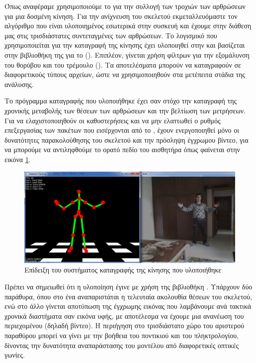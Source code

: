 Όπως αναφέραμε χρησιμοποιούμε το  για την συλλογή των τροχιών των αρθρώσεων για μια δοσμένη κίνηση. Για την ανίχνευση του σκελετού εκμεταλλευόμαστε τον αλγόριθμο που είναι υλοποιημένος εσωτερικά στην συσκευή και έχουμε στην διάθεση μας στις τρισδιάστατες συντεταγμένες των αρθρώσεων. Το λογισμικό που χρησιμοποιείται για την καταγραφή της κίνησης έχει υλοποιηθεί στην  και βασίζεται στην βιβλιοθήκη της  για το  (). Επιπλέον, γίνεται χρήση φίλτρων για την εξομάλυνση του θορύβου και του τρέμουλο (). Τα αποτελέσματα μπορούν να καταγραφούν σε διαφορετικούς τύπους αρχείων, ώστε να χρησιμοποιηθούν στα μετέπειτα στάδια της ανάλυσης.

Το πρόγραμμα καταγραφής που υλοποιήθηκε έχει σαν στόχο την καταγραφή της χρονικής μεταβολής των θέσεων των αρθρώσεων και την βελτίωση των μετρήσεων. Για να ελαχιστοποιηθούν οι καθυστερήσεις και να μην ελαττωθεί ο ρυθμός επεξεργασίας των πακέτων που εισέρχονται από το , έχουν ενεργοποιηθεί μόνο οι δυνατότητες παρακολούθησης του σκελετού και την πρόσληψη έγχρωμου βίντεο, για να μπορούμε να αντιληφθούμε το ορατό πεδίο του αισθητήρα όπως φαίνεται στην εικόνα \ref{fig:motion-capture}.

\begin{figure}[H]
    \centering
    \includegraphics[width=.9\textwidth]{fig/motion-capture.png}
    \caption{Επίδειξη του συστήματος καταγραφής της κίνησης που υλοποιήθηκε}
    \label{fig:motion-capture}
\end{figure}

Πρέπει να σημειωθεί ότι η υλοποίηση έγινε με χρήση της βιβλιοθήκη . Υπάρχουν δύο παράθυρα, όπου στο ένα αναπαριστάται η τελευταία ακολουθία θέσεων του σκελετού, ενώ στο άλλο γίνεται αποτύπωση της έγχρωμης εικόνας που λαμβάνουμε ανά τακτικά χρονικά διαστήματα σαν εικόνα υφής, με αποτέλεσμα να έχουμε μια ανανέωση του περιεχομένου (δηλαδή βίντεο). Η περιήγηση στο τρισδιάστατο χώρο του αριστερού παραθύρου μπορεί να γίνει με την βοήθεια του ποντικιού και του πληκτρολογίου, δίνοντας την δυνατότητα αναπαράστασης του μοντέλου από διαφορετικές οπτικές γωνίες.

